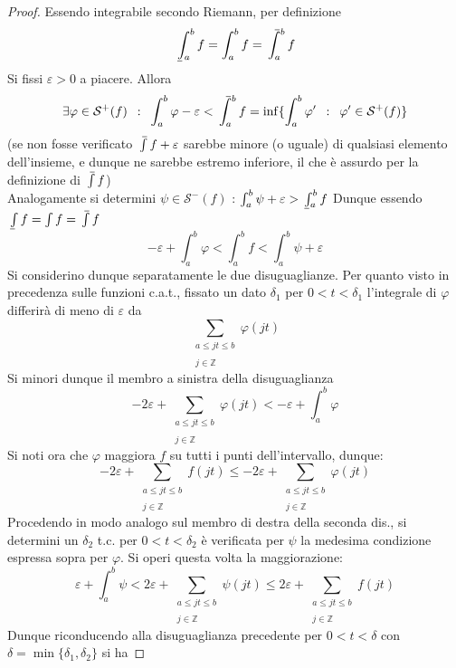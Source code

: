 \documentclass[10pt, oneside]{book}
\theoremstyle{plain}
\def\upint{\mathchoice%
    {\mkern13mu\overline{\vphantom{\intop}\mkern7mu}\mkern-20mu}%
    {\mkern7mu\overline{\vphantom{\intop}\mkern7mu}\mkern-14mu}%
    {\mkern7mu\overline{\vphantom{\intop}\mkern7mu}\mkern-14mu}%
    {\mkern7mu\overline{\vphantom{\intop}\mkern7mu}\mkern-14mu}%
  \int}
\def\lowint{\mkern3mu\underline{\vphantom{\intop}\mkern7mu}\mkern-10mu\int}
\begin{document}
\begin{proof}
    Essendo integrabile secondo Riemann, per definizione
    \[\lowint_a^b f = \int_a^b f = \upint_a^b f\]
    Si fissi $\varepsilon > 0$ a piacere. Allora 
    \[\exists \varphi \in \mathcal{S}^+(f) \enspace : \enspace \int_a^b \varphi - \varepsilon < \upint_a^b f = \inf\{\int_a^b \varphi' \enspace : \enspace \varphi' \in \mathcal{S}^+(f)\}\]
    (se non fosse verificato $\upint f + \varepsilon$ sarebbe minore (o uguale) di qualsiasi elemento dell'insieme, e dunque ne sarebbe estremo inferiore, il che è assurdo per la definizione di $\upint f$)
    \\Analogamente si determini $\psi \in \mathcal{S}^-(f)$ :  $\int_a^b \psi + \varepsilon > \lowint_a^b f$
    Dunque essendo $\lowint f = \int f = \upint f$
    \[- \varepsilon + \int_a^b \varphi < \int_a^b f < \int_a^b \psi + \varepsilon\]
    Si considerino dunque separatamente le due disuguaglianze. Per quanto visto in precedenza sulle funzioni c.a.t., fissato un dato $\delta_1$ per $0 < t < \delta_1$ l'integrale di $\varphi$ differirà di meno di $\varepsilon$ da 
    \[\sum_{\substack{a \leq jt \leq b \\~\\ j \in \mathbb{Z}}} \varphi(jt)\]
    Si minori dunque il membro a sinistra della disuguaglianza
    \[- 2 \varepsilon + \sum_{\substack{a \leq jt \leq b \\~\\ j \in \mathbb{Z}}} \varphi(jt) < -\varepsilon + \int_a^b \varphi\]
    Si noti ora che $\varphi$ maggiora $f$ su tutti i punti dell'intervallo, dunque:
    \[- 2 \varepsilon + \sum_{\substack{a \leq jt \leq b \\~\\ j \in \mathbb{Z}}} f(jt) \leq - 2 \varepsilon + \sum_{\substack{a \leq jt \leq b \\~\\ j \in \mathbb{Z}}} \varphi(jt)\]
    Procedendo in modo analogo sul membro di destra della seconda dis., si determini un $\delta_2$ t.c. per $0 < t < \delta_2$ è verificata per $\psi$ la medesima condizione espressa sopra per $\varphi$. Si operi questa volta la maggiorazione:
    \[\varepsilon + \int_a^b \psi < 2 \varepsilon + \sum_{\substack{a \leq jt \leq b \\~\\ j \in \mathbb{Z}}} \psi(jt) \leq 2 \varepsilon + \sum_{\substack{a \leq jt \leq b \\~\\ j \in \mathbb{Z}}} f(jt)\]
    Dunque riconducendo alla disuguaglianza precedente per $0 < t < \delta$ con $\delta = \min\{\delta_1, \delta_2\}$ si ha

\end{proof}
\end{document}
